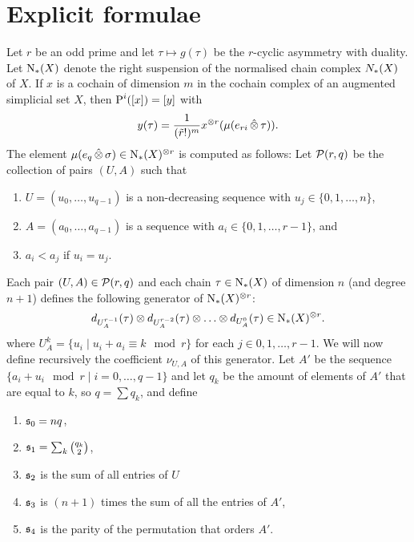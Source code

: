
\section{Explicit formulae}\label{s:formulas} 

Let $r$ be an odd prime and let $\tau\mapsto g(\tau)$ be the $r$-cyclic asymmetry with duality. Let $\operatorname{N}_{*}(X)$ denote the right suspension of the normalised chain complex $N_{*}(X)$ of $X$. If $x$ is a cochain of dimension $m$ in the cochain complex of an augmented simplicial set $X$, then $\operatorname{P}^i([x]) = [y]$ with
\[	
	y(\tau) = \frac{1}{(\tilde{r}!)^{m}}x^{\otimes r}(\mu(e_{ri}\operatorname{\hat{\otimes}} \tau)).
\]
The element $\mu(e_{q}\operatorname{\hat{\otimes}} \sigma)\in \operatorname{N}_{*}(X)^{\otimes r}$ is computed as follows: Let $\mathcal{P}(r,q)$ be the collection of pairs $(U,A)$ such that 
\renewcommand{\theenumi}{\roman{enumi}}%
\begin{enumerate}
	\item $U = (u_0,\ldots,u_{q-1})$ is a non-decreasing sequence with $u_j\in \{0,1,\ldots,n\}$,
	\item $A = (a_0,\ldots,a_{q-1})$ is a sequence with $a_i\in \{0,1,\ldots,r-1\}$, and
	\item\label{condfor:3} $a_i<a_j$ if $u_i=u_j$.
\end{enumerate} 
Each pair $(U,A)\in \mathcal{P}(r,q)$ and each chain $\tau\in \operatorname{N}_{*}(X)$ of dimension $n$ (and degree $n+1$) defines the following generator of $\operatorname{N}_{*}(X)^{\otimes r}$:
\[
	d_{U_A^{r-1}}(\tau)\otimes d_{U_A^{r-2}}(\tau)\otimes \ldots\otimes d_{U_A^{0}}(\tau)\in \operatorname{N}_{*}(X)^{\otimes r}.
\] 
where $U_A^k = \{u_i\mid u_i + a_i \equiv k\mod r\}$ for each $j\in 0,1,\ldots,r-1$. We will now define recursively the coefficient $\nu_{U,A}$ of this generator. Let $A'$ be the sequence $\{a_i+u_i\mod r\mid i=0,\ldots,q-1\}$ and let $q_k$ be the amount of elements of $A'$ that are equal to $k$, so $q=\sum q_k$, and define
\renewcommand{\theenumi}{\arabic{enumi}}%
\begin{enumerate}
    \item $\mathfrak{s}_0 = nq$,
	\item $ \mathfrak{s}_1 = \sum_k\binom{q_k}{2}$,
	\item $ \mathfrak{s}_2$ is the sum of all entries of $U$
	\item $ \mathfrak{s}_3$ is $(n+1)$ times the sum of all the entries of $A'$,
	\item $ \mathfrak{s}_4$ is the parity of the permutation that orders $A'$.
\end{enumerate}
